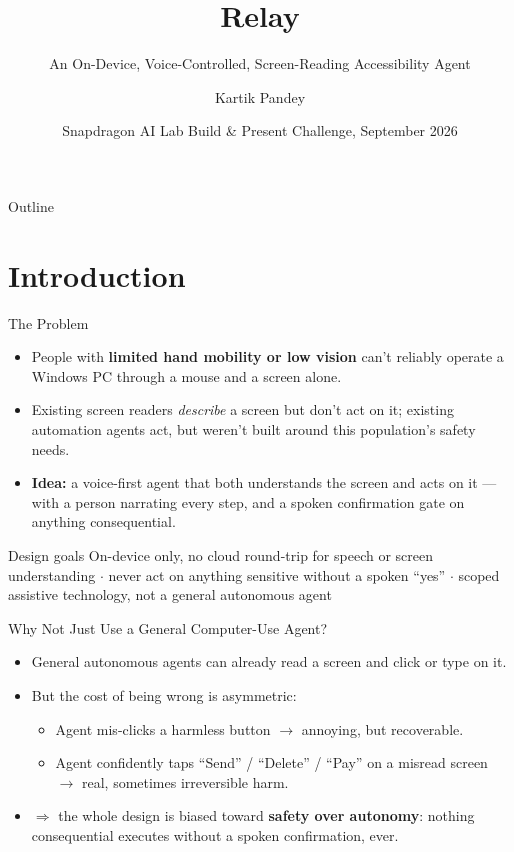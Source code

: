 \documentclass[12pt]{beamer}
\title{Relay}
\subtitle{An On-Device, Voice-Controlled, Screen-Reading Accessibility Agent}
\author{Kartik Pandey}
\institute{IIIT Naya Raipur}
\date{Snapdragon AI Lab Build \& Present Challenge, September 2026}
\begin{document}
\begin{frame}
  \titlepage
\end{frame}

\begin{frame}{Outline}
  \tableofcontents
\end{frame}

\section{Introduction}

\begin{frame}{The Problem}

\begin{itemize}
  \item People with \textbf{limited hand mobility or low vision} can't
    reliably operate a Windows PC through a mouse and a screen alone.
  \item Existing screen readers \emph{describe} a screen but don't act on
    it; existing automation agents act, but weren't built around this
    population's safety needs.
  \item \textbf{Idea:} a voice-first agent that both understands the
    screen and acts on it --- with a person narrating every step, and a
    spoken confirmation gate on anything consequential.
\end{itemize}

\vskip 0.5cm

\begin{block}{Design goals}
On-device only, no cloud round-trip for speech or screen understanding
$\cdot$ never act on anything sensitive without a spoken ``yes''
$\cdot$ scoped assistive technology, not a general autonomous agent
\end{block}

\end{frame}

\begin{frame}{Why Not Just Use a General Computer-Use Agent?}

\begin{itemize}
  \item General autonomous agents can already read a screen and click or
    type on it.
  \item But the cost of being wrong is asymmetric:
  \begin{itemize}
    \item Agent mis-clicks a harmless button $\rightarrow$ annoying, but
      recoverable.
    \item Agent confidently taps ``Send'' / ``Delete'' / ``Pay'' on a
      misread screen $\rightarrow$ real, sometimes irreversible harm.
  \end{itemize}
  \item $\Rightarrow$ the whole design is biased toward \textbf{safety
    over autonomy}: nothing consequential executes without a spoken
    confirmation, ever.
\end{itemize}

\end{frame}
\end{document}
